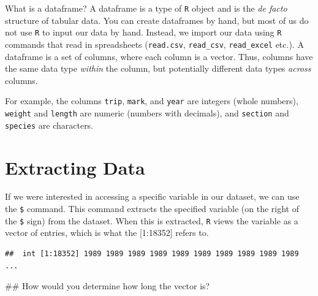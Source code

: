 \documentclass[]{article}
\newenvironment{Shaded}{\begin{snugshade}}{\end{snugshade}}
\newcommand{\KeywordTok}[1]{\textcolor[rgb]{0.13,0.29,0.53}{\textbf{#1}}}
\newcommand{\StringTok}[1]{\textcolor[rgb]{0.31,0.60,0.02}{#1}}
\newcommand{\OperatorTok}[1]{\textcolor[rgb]{0.81,0.36,0.00}{\textbf{#1}}}
\newcommand{\NormalTok}[1]{#1}
\begin{document}
What is a dataframe? A dataframe is a type of \texttt{R} object and is
the \emph{de facto} structure of tabular data. You can create dataframes
by hand, but most of us do not use \texttt{R} to input our data by hand.
Instead, we import our data using \texttt{R} commands that read in
spreadsheets (\texttt{read.csv}, \texttt{read\_csv},
\texttt{read\_excel} etc.). A dataframe is a set of columns, where each
column is a vector. Thus, columns have the same data type \emph{within}
the column, but potentially different data types \emph{across} columns.

For example, the columns \texttt{trip}, \texttt{mark}, and \texttt{year}
are integers (whole numbers), \texttt{weight} and \texttt{length} are
numeric (numbers with decimals), and \texttt{section} and
\texttt{species} are characters.

\section{Extracting Data}\label{extracting-data}

If we were interested in accessing a specific variable in our dataset,
we can use the \texttt{\$} command. This command extracts the specified
variable (on the right of the \texttt{\$} sign) from the dataset. When
this is extracted, \texttt{R} views the variable as a vector of entries,
which is what the {[}1:18352{]} refers to.

\vspace{0.25cm}

\begin{Shaded}
\end{Shaded}

\begin{verbatim}
##  int [1:18352] 1989 1989 1989 1989 1989 1989 1989 1989 1989 1989 ...
\end{verbatim}

\begin{Shaded}
\begin{Highlighting}[]
\NormalTok{## How would you determine how long the vector is?}
\end{Highlighting}
\end{Shaded}
\end{document}
